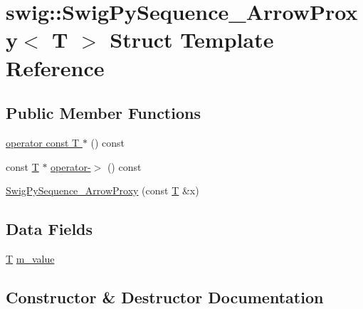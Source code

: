 \hypertarget{structswig_1_1_swig_py_sequence___arrow_proxy}{}\section{swig\+:\+:Swig\+Py\+Sequence\+\_\+\+Arrow\+Proxy$<$ T $>$ Struct Template Reference}
\label{structswig_1_1_swig_py_sequence___arrow_proxy}
\subsection*{Public Member Functions}
\begin{DoxyCompactItemize}
\item 
\hyperlink{structswig_1_1_swig_py_sequence___arrow_proxy_a6e0e0a0f3bb533b48aa05bd94165929b}{operator const T $\ast$} () const
\item 
const \hyperlink{fmt_8h_a0acb682b8260ab1c60b918599864e2e5}{T} $\ast$ \hyperlink{structswig_1_1_swig_py_sequence___arrow_proxy_a8f9c6d4d0feb5cf17f8cb06e30f5721e}{operator-\/$>$} () const
\item 
\hyperlink{structswig_1_1_swig_py_sequence___arrow_proxy_a28b1117f7ac65b3ec51101215306a9d9}{Swig\+Py\+Sequence\+\_\+\+Arrow\+Proxy} (const \hyperlink{fmt_8h_a0acb682b8260ab1c60b918599864e2e5}{T} \&x)
\end{DoxyCompactItemize}
\subsection*{Data Fields}
\begin{DoxyCompactItemize}
\item 
\hyperlink{fmt_8h_a0acb682b8260ab1c60b918599864e2e5}{T} \hyperlink{structswig_1_1_swig_py_sequence___arrow_proxy_a7e68416553925e7556e737325c324e0f}{m\+\_\+value}
\end{DoxyCompactItemize}


\subsection{Constructor \& Destructor Documentation}
\mbox{\label{structswig_1_1_swig_py_sequence___arrow_proxy_a28b1117f7ac65b3ec51101215306a9d9}} 
